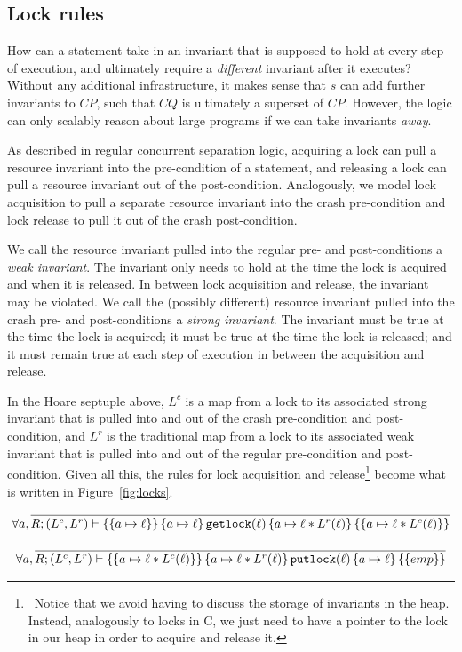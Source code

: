 \subsection{Lock rules}
\label{sec:lockrules}

How can a statement take in an invariant that is supposed to hold at every step
of execution, and ultimately require a \textit{different} invariant after it
executes? Without any additional infrastructure, it makes sense that $s$ can add
further invariants to $CP$, such that $CQ$ is ultimately a superset of $CP$.
However, the logic can only scalably reason about large programs if we can
take invariants \textit{away}.

As described in regular concurrent separation logic, acquiring a lock can pull a
resource invariant into the pre-condition of a statement, and releasing a lock
can pull a resource invariant out of the post-condition.
Analogously, we model
lock acquisition to pull a separate resource invariant into the crash
pre-condition and lock release to pull it out of the crash post-condition.

We call the resource invariant pulled into the regular pre- and post-conditions
a \textit{weak invariant}.
The invariant only needs to hold at the time the lock
is acquired and when it is released.
In between lock acquisition and release,
the invariant may be violated.
We call the (possibly different) resource
invariant pulled into the crash pre- and post-conditions a \textit{strong
invariant}.
The invariant must be true at the time the lock is acquired; it must
be true at the time the lock is released; and it must remain true at each step
of execution in between the acquisition and release.

In the Hoare septuple above, $L^c$ is a map from a lock to its associated strong
invariant that is pulled into and out of the crash pre-condition and
post-condition, and $L^r$ is the traditional map from a lock to its associated
weak invariant that is pulled into and out of the regular pre-condition and
post-condition.
Given all this, the rules for lock acquisition and release\footnote{\
Notice that we avoid
having to discuss the storage of invariants in the heap.
Instead, analogously
to locks in C, we just need to have a pointer to the lock in our heap in order
to acquire and release it.}
become what is written in Figure~\ref{fig:locks}.

\begin{figure*}
\begin{gather*}
    \forall a, \infer{\hoarestmt{R}{(L^c,L^r)}{a \mapsto \ell}{a \mapsto \ell}{\texttt{getlock}(\ell)}{a \mapsto \ell *
    L^r(\ell)}{a \mapsto \ell * L^c(\ell)}}{} \\[+9px]
    \forall a, \infer{\hoarestmt{R}{(L^c,L^r)}{a \mapsto \ell * L^c(\ell)}{a \mapsto \ell *
    L^r(\ell)}{\texttt{putlock}(\ell)}{a \mapsto \ell}{emp}}{}
\end{gather*}
\caption{Rules for getlock and putlock}
\label{fig:locks}
\end{figure*}

